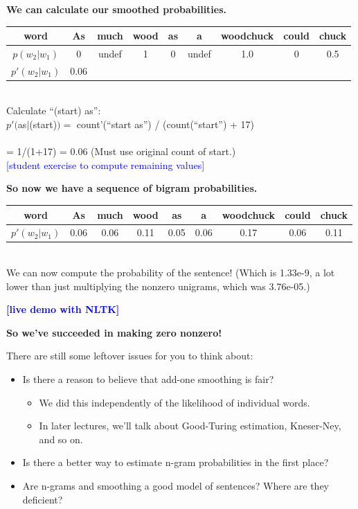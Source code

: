 \documentclass{beamer}
\newcommand{\placard}[1]{
  \begin{frame}
    \begin{center}
      \huge
      \textbf{#1}
    \end{center}
  \end{frame}
}
\newcommand{\pagestepalt}[2]{
  \begin{frame}[t]
    \begin{minipage}[t][0.26\textheight][t]{\textwidth}
      \begin{center}
        \huge
        \textbf{#1}
      \end{center}
    \end{minipage}
    
    \begin{minipage}[t][0.7\textheight][t]{\textwidth}
      #2
    \end{minipage}
  \end{frame}
}
\begin{document}
\pagestepalt{We can calculate our smoothed probabilities.}{
  \begin{tabular}{c|cccccccc}
    word & As & much & wood & as & a & woodchuck & could & chuck\\
    \hline
    $p(w_2|w_1)$ &\alert{0}&\alert{undef}&\alert{1} & \alert{0} & \alert{undef} & \alert{1.0} & \alert{0} & 0.5\\
    \alert{$p'(w_2|w_1)$} & \alert{0.06} \\
  \end{tabular}  \\

  \vspace{0.1cm}
  Calculate ``(start) as'': 
  \\$p'($as$|$(start)$) =$ count'(``start as'') / (count(``start'') + 17)\\
  \\= 1/(1+17) = 0.06
  (Must use original count of start.)\\
  \textcolor{blue}{[student exercise to compute remaining values]}
}


\pagestepalt{So now we have a sequence of bigram probabilities.}{
  \begin{tabular}{c|cccccccc}
    word & As & much & wood & as & a & woodchuck & could & chuck\\
    \hline
    \alert{$p'(w_2|w_1)$} & \alert{0.06} & \alert{0.06} & \alert{0.11} & \alert{0.05} & \alert{0.06} & \alert{0.17} & \alert{0.06} & \alert{0.11}\\
  \end{tabular}  \\

  We can now compute the probability of the sentence!\pause 
  (Which is
  1.33e-9, a lot lower than just multiplying the nonzero unigrams,
  which was 3.76e-05.)  
}

\placard{\textcolor{blue}{[live demo with NLTK]}}

\pagestepalt{So we've succeeded in making zero nonzero!}{
  There are still some leftover issues for you to think about: \pause
  \begin{itemize}
  \item Is there a reason to believe that add-one smoothing is fair? 
    \begin{itemize}
    \item We did this independently of the likelihood of individual words.
    \item In later lectures, we'll talk about Good-Turing estimation,
      Kneser-Ney, and so on.
    \end{itemize}\pause
  \item Is there a better way to estimate n-gram probabilities in the first place?\pause 
  \item Are n-grams and smoothing a good model of sentences? Where are they 
    deficient?
  \end{itemize}
}
\end{document}

